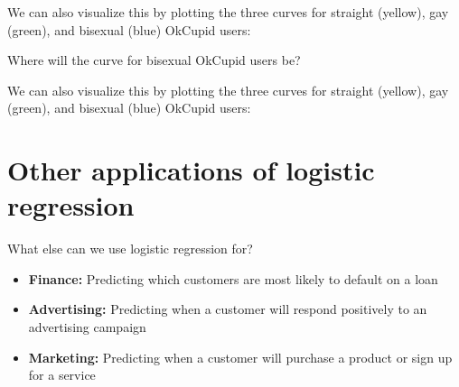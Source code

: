 \documentclass{beamer}\usepackage[]{graphicx}\usepackage[]{color}
\newenvironment{knitrout}{}{} %
\begin{document}
\begin{darkframes}
    \begin{frame}
      We can also visualize this by plotting the three curves for straight (yellow), gay (green), and bisexual (blue) OkCupid users:
\begin{knitrout}


\end{knitrout}
      Where will the curve for bisexual OkCupid users be?
    \end{frame}

    \begin{frame}
      We can also visualize this by plotting the three curves for straight (yellow), gay (green), and bisexual (blue) OkCupid users:
\begin{knitrout}


\end{knitrout}
    \end{frame}

    \section{Other applications of logistic regression}

    \begin{frame}{What else can we use logistic regression for?}
      \begin{itemize}
        \item \textbf{Finance:} Predicting which customers are most likely to default on a loan
        \item \textbf{Advertising:} Predicting when a customer will respond positively to an advertising campaign
        \item \textbf{Marketing:} Predicting when a customer will purchase a product or sign up for a service
      \end{itemize}
    \end{frame}
  \end{darkframes}
\end{document}
